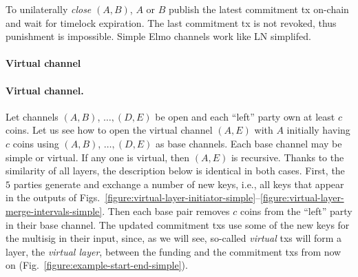  To unilaterally \emph{close} $(A, B)$, $A$ or $B$ publish the latest
  commitment tx on-chain and wait for timelock expiration. The last
  commitment tx is not revoked, thus punishment is impossible. Simple Elmo
  channels work like LN simplifed.

  \makeatletter%
    {\paragraph{Virtual channel}}%
    {\paragraph{Virtual channel.}}%
  \makeatother%

  Let channels $(A, B)$, $\dots,(D, E)$ be open and each ``left'' party own at
  least $c$ coins. Let us see how to open the virtual channel $(A, E)$ with $A$
  initially having $c$ coins using $(A, B)$, $\dots,(D, E)$ as base channels.
  Each base channel may be simple or virtual. If any one is virtual, then $(A,
  E)$ is recursive. Thanks to the similarity of all layers, the description
  below is identical in both cases. First, the $5$ parties generate and exchange
  a number of new
  keys, i.e., all keys that appear in the outputs of
  Figs.~\ref{figure:virtual-layer-initiator-simple}--\ref{figure:virtual-layer-merge-intervals-simple}. Then
  each base pair removes $c$ coins from the ``left'' party in
  their base channel. The updated commitment txs use some of the new
  keys for the multisig in their input, since, as we will see, so-called \emph{virtual}
  txs will form a layer, the \emph{virtual layer}, between the funding and the
  commitment txs from now on (Fig.~\ref{figure:example-start-end-simple}).

